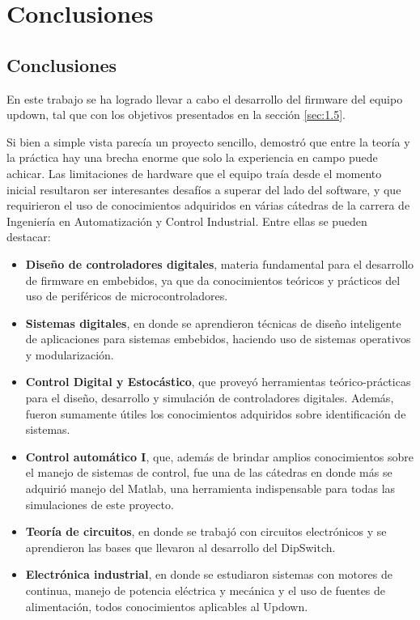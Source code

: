 \chapter{Conclusiones}
\thispagestyle{empty}

\section{Conclusiones} \label{sec:\thesection}
En este trabajo se ha logrado llevar a cabo el desarrollo del firmware del equipo updown, tal que con los objetivos presentados en la sección \ref{sec:1.5}. 

Si bien a simple vista parecía un proyecto sencillo, demostró que entre la teoría y la práctica hay una brecha enorme que solo la experiencia en campo puede achicar. Las limitaciones de hardware que el equipo traía desde el momento inicial resultaron ser interesantes desafíos a superar del lado del software, y que requirieron el uso de conocimientos adquiridos en várias cátedras de la carrera de Ingeniería en Automatización y Control Industrial. Entre ellas se pueden destacar:

\begin{itemize}
	\item \textbf{Diseño de controladores digitales}, materia fundamental para el desarrollo de firmware en embebidos, ya que da conocimientos teóricos y prácticos del uso de periféricos de microcontroladores. 
	\item \textbf{Sistemas digitales}, en donde se aprendieron técnicas de diseño inteligente de aplicaciones para sistemas embebidos, haciendo uso de sistemas operativos y modularización.	
	\item \textbf{Control Digital y Estocástico}, que proveyó herramientas teórico-prácticas para el diseño, desarrollo y simulación de controladores digitales. Además, fueron sumamente útiles los conocimientos adquiridos sobre identificación de sistemas.
	\item \textbf{Control automático I}, que, además de brindar amplios conocimientos sobre el manejo de sistemas de control, fue una de las cátedras en donde más se adquirió manejo del Matlab, una herramienta indispensable para todas las simulaciones de este proyecto.
	\item \textbf{Teoría de circuitos}, en donde se trabajó con circuitos electrónicos y se aprendieron las bases que llevaron al desarrollo del DipSwitch.
	\item \textbf{Electrónica industrial}, en donde se estudiaron sistemas con motores de continua, manejo de potencia eléctrica y mecánica y el uso de fuentes de alimentación, todos conocimientos aplicables al Updown.
\end{itemize}

